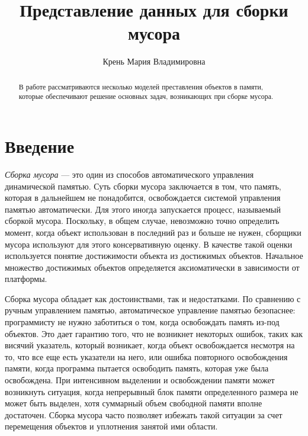 \title{Представление данных для сборки мусора}
%
\author{Крень Мария Владимировна}
%
%
%

\maketitle              %

\begin{abstract}
В работе рассматриваются несколько моделей преставления объектов
в памяти, которые обеспечивают решение основных задач, возникающих
при сборке мусора.
\end{abstract}
%

\section*{Введение}

\emph{Сборка мусора} --- это один из способов автоматического управления динамической памятью.
Суть сборки мусора заключается в том, что память, которая в дальнейшем не понадобится, освобождается системой управления памятью автоматически. 
Для этого иногда запускается процесс, называемый сборкой  мусора.
Поскольку, в общем случае, невозможно точно определить момент, когда объект использован в последний раз и
больше не нужен, сборщики мусора используют для этого консервативную оценку.
В качестве такой оценки используется понятие достижимости объекта из достижимых объектов. 
Начальное множество достижимых объектов определяется аксиоматически в зависимости от платформы.

Сборка мусора обладает как достоинствами, так и недостатками.
По сравнению с ручным управлением памятью, автоматическое управление памятью безопаснее: программисту не нужно 
заботиться о том, когда освобождать память из-под объектов. 
Это дает гарантию того, что не возникнет некоторых ошибок, таких как
висячий указатель, который возникает, когда объект освобождается несмотря на то, 
что все еще есть
указатели на него, или ошибка повторного освобождения памяти, 
когда программа пытается освободить память, которая уже  была освобождена.
При интенсивном выделении и освобождении памяти может возникнуть ситуация,
когда непрерывный блок памяти определенного размера не может быть выделен,
хотя суммарный объем свободной памяти вполне достаточен. Сборка мусора часто позволяет избежать такой
ситуации за счет перемещения объектов и уплотнения занятой ими области.

